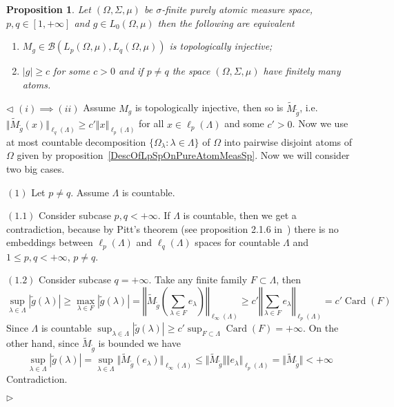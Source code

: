 \documentclass[12pt]{article}
\newtheorem{proposition}[theorem]{Proposition}
\newenvironment{proof}{\par $\triangleleft$}{$\triangleright$}
\begin{document}
\begin{proposition}\label{TopInjMultOpCharacOnPureAtomMeasSp} Let
    $(\Omega,\Sigma,\mu)$ be $\sigma$-finite purely atomic measure space,
    $p,q\in[1,+\infty]$ and $g\in L_0(\Omega,\mu)$ then the following are
    equivalent
    \begin{enumerate}[label = (\roman*)]
        \item $M_g\in\mathcal{B}(L_p(\Omega,\mu),L_q(\Omega,\mu))$ is
              topologically injective;

        \item $|g|\geq c$ for some $c>0$ and if $p\neq q$ the space
              $(\Omega,\Sigma,\mu)$ have finitely many atoms.
    \end{enumerate}
\end{proposition}
\begin{proof}
    $(i)\implies (ii)$ Assume $M_g$ is topologically injective, then so is
    $\widetilde{M}_{\widetilde{g}}$, i.e.
    $\Vert\widetilde{M}_{\widetilde{g}}(x)\Vert_{\ell_q(\Lambda)}\geq c'\Vert
        x\Vert_{\ell_p(\Lambda)}$ for all $x\in\ell_p(\Lambda)$ and some $c'>0$. Now
    we use at most countable decomposition $ \{\Omega_\lambda:\lambda\in\Lambda
        \}$ of $\Omega$ into pairwise disjoint atoms of $\Omega$ given by
    proposition~\ref{DescOfLpSpOnPureAtomMeasSp}. Now we will consider two big
    cases.

    $(1)$ Let $p\neq q$. Assume $\Lambda$ is countable.

    $(1.1)$ Consider subcase $p,q<+\infty$. If $\Lambda$ is countable, then we
    get a  contradiction, because by Pitt's theorem (see proposition 2.1.6
    in~\cite{KalAlbTopicsBanSpTh}) there is no embeddings between
    $\ell_p(\Lambda)$ and $\ell_q(\Lambda)$ spaces for countable $\Lambda$ and
    $1\leq p,q<+\infty$, $p\neq q$.

    $(1.2)$ Consider subcase $q=+\infty$. Take any finite family
    $F\subset\Lambda$, then
    $$
        \sup_{\lambda\in\Lambda}|\widetilde{g}(\lambda)|
        \geq\max_{\lambda\in F}|\widetilde{g}(\lambda)|
        =\left\Vert\widetilde{M}_{\widetilde{g}}\left(
        \sum_{\lambda\in F}e_\lambda
        \right)\right\Vert_{\ell_\infty(\Lambda)}
        \geq c'\left\Vert
        \sum_{\lambda\in F}e_\lambda
        \right\Vert_{\ell_p(\Lambda)}
        =c'\operatorname{Card}(F)
    $$
    Since $\Lambda$ is countable
    $\sup_{\lambda\in\Lambda}|\widetilde{g}(\lambda)|\geq
        c'\sup_{F\subset\Lambda}\operatorname{Card}(F)=+\infty$. On the other hand,
    since $\widetilde{M}_{\widetilde{g}}$ is bounded we have
    $$
        \sup_{\lambda\in\Lambda}|\widetilde{g}(\lambda)|
        =\sup_{\lambda\in\Lambda}\Vert
        \widetilde{M}_{\widetilde{g}}(e_\lambda)\Vert_{\ell_\infty(\Lambda)}
        \leq\Vert\widetilde{M}_{\widetilde{g}}\Vert\Vert
        e_\lambda\Vert_{\ell_p(\Lambda)}
        =\Vert\widetilde{M}_{\widetilde{g}}\Vert<+\infty
    $$
    Contradiction.


\end{proof}
\end{document}
